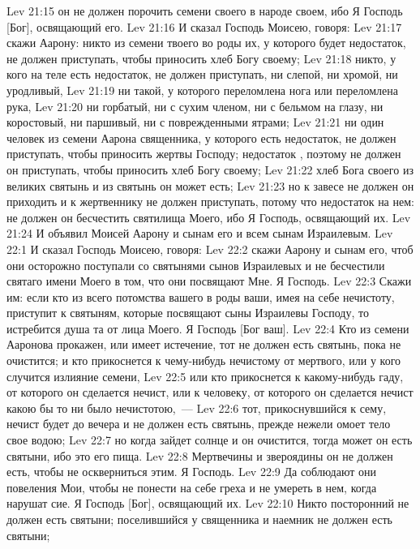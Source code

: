 \vs Lev 21:15 он не должен порочить семени своего в народе своем, ибо Я Господь [Бог], освящающий его.
\rsbpar\vs Lev 21:16 И сказал Господь Моисею, говоря:
\vs Lev 21:17 скажи Аарону: никто из семени твоего во  роды их, у которого  будет недостаток, не должен приступать, чтобы приносить хлеб Богу своему;
\vs Lev 21:18 никто, у кого на теле есть недостаток, не должен приступать, ни слепой, ни хромой, ни уродливый,
\vs Lev 21:19 ни такой, у которого переломлена нога или переломлена рука,
\vs Lev 21:20 ни горбатый, ни с сухим членом, ни с бельмом на глазу, ни коростовый, ни паршивый, ни с поврежденными ятрами;
\vs Lev 21:21 ни один человек из семени Аарона священника, у которого  есть недостаток, не должен приступать, чтобы приносить жертвы Господу; недостаток , поэтому не должен он приступать, чтобы приносить хлеб Богу своему;
\vs Lev 21:22 хлеб Бога своего из великих святынь и из святынь он может есть;
\vs Lev 21:23 но к завесе не должен он приходить и к жертвеннику не должен приступать, потому что недостаток на нем: не должен он бесчестить святилища Моего, ибо Я Господь, освящающий их.
\vs Lev 21:24 И объявил  Моисей Аарону и сынам его и всем сынам Израилевым.
\vs Lev 22:1 И сказал Господь Моисею, говоря:
\vs Lev 22:2 скажи Аарону и сынам его, чтоб они осторожно поступали со святынями сынов Израилевых и не бесчестили святаго имени Моего в том, что они посвящают Мне. Я Господь.
\vs Lev 22:3 Скажи им: если кто из всего потомства вашего в роды ваши, имея на себе нечистоту, приступит к святыням, которые посвящают сыны Израилевы Господу, то истребится душа та от лица Моего. Я Господь [Бог ваш].
\vs Lev 22:4 Кто из семени Ааронова прокажен, или имеет истечение, тот не должен есть святынь, пока не очистится; и кто прикоснется к чему-нибудь нечистому от мертвого, или у кого случится излияние семени,
\vs Lev 22:5 или кто прикоснется к какому-нибудь гаду, от которого он сделается нечист, или к человеку, от которого он сделается нечист какою бы то ни было нечистотою,~---
\vs Lev 22:6 тот, прикоснувшийся к сему, нечист будет до вечера и не должен есть святынь, прежде нежели омоет тело свое водою;
\vs Lev 22:7 но когда зайдет солнце и он очистится, тогда может он есть святыни, ибо это его пища.
\vs Lev 22:8 Мертвечины и звероядины он не должен есть, чтобы не оскверниться этим. Я Господь.
\vs Lev 22:9 Да соблюдают они повеления Мои, чтобы не понести на себе греха и не умереть в нем, когда нарушат сие. Я Господь [Бог], освящающий их.
\vs Lev 22:10 Никто посторонний не должен есть святыни; поселившийся у священника и наемник не должен есть святыни;

